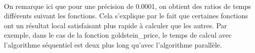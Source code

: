     \FloatBarrier
    
    \paragraph{}
    On remarque ici que pour une précision de 0.0001, on obtient des ratios de temps différents suivant les fonctions. Cela s'explique par le fait que certaines fonctions ont un résultat local satisfaisant plus rapide à calculer que les autres. Par exemple, dans le cas de la fonction goldstein\_price, le temps de calcul avec l'algorithme séquentiel est deux plus long qu'avec l'algorithme parallèle. 

